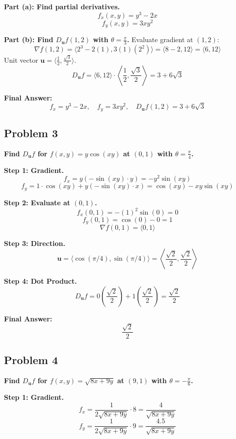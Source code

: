 \documentclass{article}
\begin{document}
\textbf{Part (a): Find partial derivatives.}
\[ f_x(x, y) = y^3 - 2x \]
\[ f_y(x, y) = 3xy^2 \]

\textbf{Part (b): Find $D_{\mathbf{u}}f(1, 2)$ with $\theta = \frac{\pi}{3}$.}
Evaluate gradient at $(1, 2)$:
\[ \nabla f(1, 2) = \langle 2^3 - 2(1), 3(1)(2^2) \rangle = \langle 8 - 2, 12 \rangle = \langle 6, 12 \rangle \]
Unit vector $\mathbf{u} = \langle \frac{1}{2}, \frac{\sqrt{3}}{2} \rangle$.
\[ D_{\mathbf{u}}f = \langle 6, 12 \rangle \cdot \left\langle \frac{1}{2}, \frac{\sqrt{3}}{2} \right\rangle = 3 + 6\sqrt{3} \]

\textbf{Final Answer:}
\[ f_x = \boxed{y^3 - 2x}, \quad f_y = \boxed{3xy^2}, \quad D_{\mathbf{u}}f(1, 2) = \boxed{3 + 6\sqrt{3}} \]

\hrulefill

\subsection*{Problem 3}
\textbf{Find $D_{\mathbf{u}}f$ for $f(x, y) = y \cos(xy)$ at $(0, 1)$ with $\theta = \frac{\pi}{4}$.}

\textbf{Step 1: Gradient.}
\[ f_x = y(-\sin(xy) \cdot y) = -y^2 \sin(xy) \]
\[ f_y = 1 \cdot \cos(xy) + y(-\sin(xy) \cdot x) = \cos(xy) - xy \sin(xy) \]

\textbf{Step 2: Evaluate at $(0, 1)$.}
\[ f_x(0, 1) = -(1)^2 \sin(0) = 0 \]
\[ f_y(0, 1) = \cos(0) - 0 = 1 \]
\[ \nabla f(0, 1) = \langle 0, 1 \rangle \]

\textbf{Step 3: Direction.}
\[ \mathbf{u} = \langle \cos(\pi/4), \sin(\pi/4) \rangle = \left\langle \frac{\sqrt{2}}{2}, \frac{\sqrt{2}}{2} \right\rangle \]

\textbf{Step 4: Dot Product.}
\[ D_{\mathbf{u}}f = 0\left(\frac{\sqrt{2}}{2}\right) + 1\left(\frac{\sqrt{2}}{2}\right) = \frac{\sqrt{2}}{2} \]

\textbf{Final Answer:}
\[ \boxed{\frac{\sqrt{2}}{2}} \]

\hrulefill

\subsection*{Problem 4}
\textbf{Find $D_{\mathbf{u}}f$ for $f(x, y) = \sqrt{8x + 9y}$ at $(9, 1)$ with $\theta = -\frac{\pi}{6}$.}

\textbf{Step 1: Gradient.}
\[ f_x = \frac{1}{2\sqrt{8x+9y}} \cdot 8 = \frac{4}{\sqrt{8x+9y}} \]
\[ f_y = \frac{1}{2\sqrt{8x+9y}} \cdot 9 = \frac{4.5}{\sqrt{8x+9y}} \]
\end{document}
